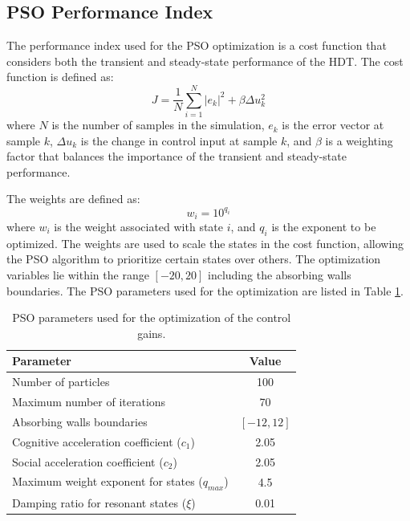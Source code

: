 \subsection{PSO Performance Index}

The performance index used for the PSO optimization is a cost function that considers both the transient and steady-state performance of the HDT. The cost function is defined as:
\begin{equation}
    J = \dfrac{1}{N} \sum_{i=1}^{N} |e_k|^2 + \beta \Delta u_k^2
\end{equation}
where $N$ is the number of samples in the simulation, $e_k$ is the error vector at sample $k$, $\Delta u_k$ is the change in control input at sample $k$, and $\beta$ is a weighting factor that balances the importance of the transient and steady-state performance.

The weights are defined as:
\begin{equation}
    w_i = 10^{q_i}
\end{equation}
where $w_i$ is the weight associated with state $i$, and $q_i$ is the exponent to be optimized. The weights are used to scale the states in the cost function, allowing the PSO algorithm to prioritize certain states over others. The optimization variables lie within the range $[-20,20]$ including the absorbing walls boundaries. The PSO parameters used for the optimization are listed in Table \ref{tab:PSO_Parameters}.

\begin{table}[h!]
    \centering
    \caption{PSO parameters used for the optimization of the control gains.}
    \label{tab:PSO_Parameters}
    \begin{tabular}{|l|c|}
        \hline
        \textbf{Parameter} & \textbf{Value}\\
        \hline\hline
        Number of particles & 100\\
        Maximum number of iterations & 70\\
        Absorbing walls boundaries & $[-12, 12]$\\
        Cognitive acceleration coefficient ($c_1$) & 2.05\\
        Social acceleration coefficient ($c_2$) & 2.05\\
        Maximum weight exponent for states ($q_{max}$) & 4.5\\
        Damping ratio for resonant states ($\xi$) & 0.01\\
        \hline
    \end{tabular}
\end{table}

